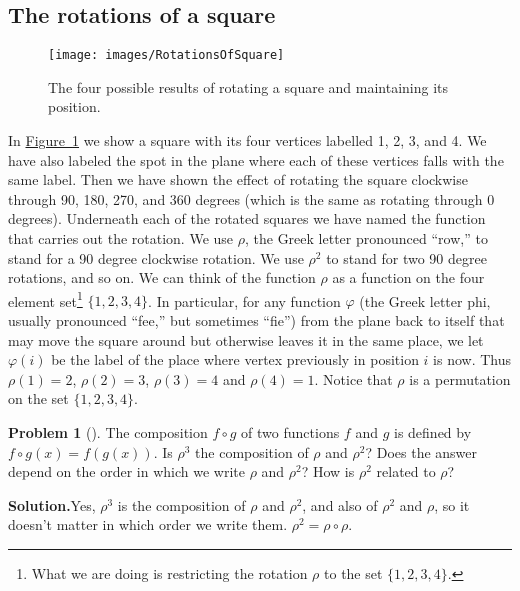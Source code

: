 \documentclass[10pt,]{book}
\theoremstyle{plain}
\theoremstyle{definition}
\newtheorem{activity}[project]{Problem}
\theoremstyle{definition}
\numberwithin{equation}{chapter}
\begin{document}
\subsection[{The rotations of a square}]{The rotations of a square}\label{subsection-50}
\leavevmode%
\begin{figure}
\centering
\texttt{[image: images/RotationsOfSquare]}
\caption{The four possible results of rotating a square and maintaining its position.\label{RotationsOfSquare}}
\end{figure}
In \hyperref[RotationsOfSquare]{Figure~\ref{RotationsOfSquare}} we show a square with its four vertices labelled 1, 2, 3, and 4. We have also labeled the spot in the plane where each of these vertices falls with the same label. Then we have shown the effect of rotating the square clockwise through 90, 180, 270, and 360 degrees (which is the same as rotating through 0 degrees). Underneath each of the rotated squares we have named the function that carries out the rotation. We use \(\rho\), the Greek letter pronounced ``row,'' to stand for a 90 degree clockwise rotation. We use \(\rho^2\) to stand for two 90 degree rotations, and so on. We can think of the function \(\rho\) as a function on the four element set\footnote{What we are doing is restricting the rotation \(\rho\) to the set \(\{1,2,3,4\}\).\label{fn-19}} \(\{1,2,3,4\}\). In particular, for any function \(\varphi\) (the Greek letter phi, usually pronounced ``fee,'' but sometimes ``fie'') from the plane back to itself that may move the square around but otherwise leaves it in the same place, we let \(\varphi(i)\) be the label of the place where vertex previously in position \(i\) is now. Thus \(\rho(1) =2\), \(\rho(2)=3\), \(\rho(3)=4\) and \(\rho(4) =1\). Notice that \(\rho\) is a permutation on the set \(\{1,2,3,4\}\).%
\begin{activity}[]\label{composition1}
The composition \(f\circ g\) of two functions \(f\) and \(g\) is defined by \(f\circ g(x) = f(g(x))\). Is \(\rho^3\) the composition of \(\rho\) and \(\rho^2\)? Does the answer depend on the order in which we write \(\rho\) and \(\rho^2\)? How is \(\rho^2\) related to \(\rho\)?%
\par\medskip\noindent%
\textbf{Solution.}\quad Yes, \(\rho^3\) is the composition of \(\rho\) and \(\rho^2\), and also of \(\rho^2\) and \(\rho\), so it doesn't matter in which order we write them. \(\rho^2=\rho\circ\rho\).%
\end{activity}
\end{document}
